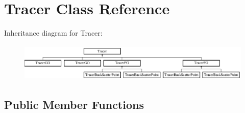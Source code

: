 \hypertarget{class_tracer}{}\section{Tracer Class Reference}
\label{class_tracer}
Inheritance diagram for Tracer\+:\begin{figure}[H]
\begin{center}
\leavevmode
\includegraphics[height=1.818182cm]{class_tracer}
\end{center}
\end{figure}
\subsection*{Public Member Functions}

